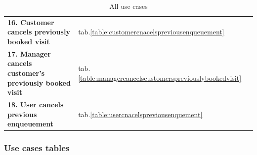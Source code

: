 \begin{table}[h!]
\begin{tabular}{@{}P{0.57\textwidth}P{0.20\textwidth}P{0.20\textwidth}@{}}
        \textbf{16. Customer cancels previously booked visit} & tab.\ref{table:customercnacelspreviousenqueuement} & \\
        \textbf{17. Manager cancels customer's previously booked visit} & tab.\ref{table:managercancelscustomerspreviouslybookedvisit} & \\
        \textbf{18. User cancels previous enqueuement} & tab.\ref{table:usercnacelspreviousenquement} & \\
        \bottomrule
    \end{tabular}
\caption{All use cases}
\label{table:usecaseindex}
\end{table}

\FloatBarrier

\subsubsection{Use cases tables}

